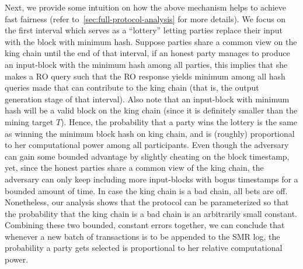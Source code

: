 Next, we provide some intuition on how the above mechanism helps to achieve fast fairness (refer to~\cref{sec:full-protocol-analysis} for more details).
%
We focus on the first interval which serves as a ``lottery''  letting parties replace their input with the block with minimum hash.
%
Suppose parties share a common view on the king chain until the end of that interval, if an honest party manages to produce an input-block with the minimum hash among all parties, this implies that she makes a RO query such that the RO response yields minimum among all hash queries made that can contribute to the king chain (that is, the output generation stage of that interval).
%
Also note that an input-block with minimum hash will be a valid block on the king chain (since it is definitely smaller than the mining target $T$).
%
Hence, the probability that a party wins the lottery is the same as winning the minimum block hash on king chain, and is (roughly) proportional to her computational power among all participants.
%
Even though the adversary can gain some bounded advantage by slightly cheating on the block timestamp, yet, since the honest parties share a common view of the king chain, the adversary can only keep including more input-blocks with bogus timestamps for a bounded amount of time.
%
In case the king chain is a bad chain, all bets are off.
%
Nonetheless, our analysis shows that the protocol can be parameterized so that the probability that the king chain is a bad chain is an arbitrarily small constant.
%
Combining these two bounded, constant errors together, we can conclude that whenever a new batch of transactions is to be appended to the SMR log, the probability a party gets selected is proportional to her relative computational power.
